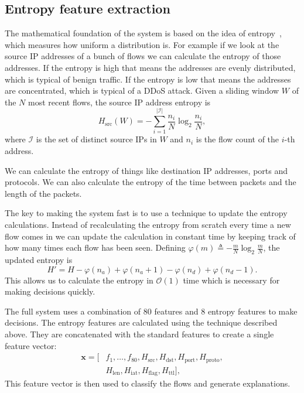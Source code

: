\documentclass{ieeeaccess}
\begin{document}
\subsection{Entropy feature extraction}
The mathematical foundation of the system is based on the idea of entropy~\cite{shannon1948mathematical}, which measures how uniform a distribution is. For example if we look at the source IP addresses of a bunch of flows we can calculate the entropy of those addresses. If the entropy is high that means the addresses are evenly distributed, which is typical of benign traffic. If the entropy is low that means the addresses are concentrated, which is typical of a DDoS attack. Given a sliding window $W$ of the $N$ most recent flows, the source IP address entropy is
\begin{equation}
H_{\mathrm{src}}(W) = -\sum_{i=1}^{|\mathcal{I}|} \frac{n_i}{N} \log_2 \frac{n_i}{N},
\label{eq:srcip}
\end{equation}
where $\mathcal{I}$ is the set of distinct source IPs in $W$ and $n_i$ is the flow count of the $i$-th address.

We can calculate the entropy of things like destination IP addresses, ports and protocols. We can also calculate the entropy of the time between packets and the length of the packets.

The key to making the system fast is to use a technique to update the entropy calculations. Instead of recalculating the entropy from scratch every time a new flow comes in we can update the calculation in constant time by keeping track of how many times each flow has been seen. Defining $\varphi(m) \triangleq -\frac{m}{N}\log_2\frac{m}{N}$, the updated entropy is
\begin{equation}
H' = H - \varphi(n_a) + \varphi(n_a{+}1) - \varphi(n_d) + \varphi(n_d{-}1).
\label{eq:rolling}
\end{equation}
This allows us to calculate the entropy in $\mathcal{O}(1)$ time which is necessary for making decisions quickly.

The full system uses a combination of 80 features and 8 entropy features to make decisions. The entropy features are calculated using the technique described above. They are concatenated with the standard features to create a single feature vector:
\begin{equation}
\begin{aligned}
\mathbf{x} = \bigl[ &f_1, \ldots, f_{80}, H_{\mathrm{src}}, H_{\mathrm{dst}}, H_{\mathrm{port}}, H_{\mathrm{proto}}, \\
&H_{\mathrm{len}}, H_{\mathrm{iat}}, H_{\mathrm{flag}}, H_{\mathrm{ttl}} \bigr],
\end{aligned}
\label{eq:fvec}
\end{equation}
This feature vector is then used to classify the flows and generate explanations.
\end{document}
